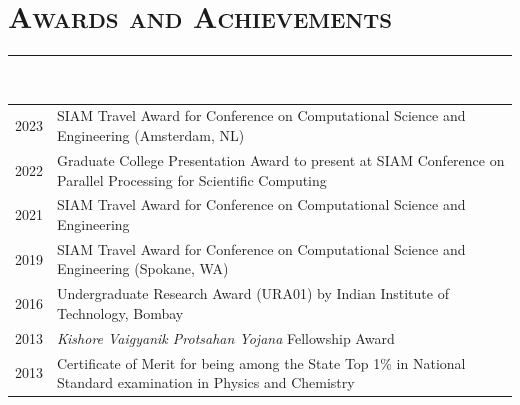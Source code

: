 \documentclass[letterpaper, 13pt]{article}
\begin{document}



\nocite{*}
\printbibliography[title={\Large\textsc{Publications}\vspace*{-2ex}\\\rule{\textwidth}{0.1ex}},filter=papers]
\printbibliography[title={\Large\textsc{Talks}\vspace*{-2ex}\\\rule{\textwidth}{0.1ex}},type=inproceedings, resetnumbers=true]

\pagebreak


\section*{\Large\textsc{Awards and Achievements}}
\vspace{-4ex}
\rule{\textwidth}{0.1ex}
\vspace{1ex}\\
\begin{tabular}{p{} p{}}
  2023    &   SIAM Travel Award for Conference on Computational Science and
    Engineering (Amsterdam, NL)\vspace{1ex}\\
  2022    &   Graduate College Presentation Award to present at SIAM Conference
    on Parallel Processing for Scientific Computing \vspace{1ex}\\
  2021    &   SIAM Travel Award for Conference on Computational Science and
    Engineering \vspace{1ex}\\
  2019    &   SIAM Travel Award for Conference on Computational Science and
    Engineering (Spokane, WA) \vspace{1ex}\\
  2016    &   Undergraduate Research Award (URA01) by Indian Institute of
    Technology, Bombay \vspace{1ex}\\
  2013    &   \textit{Kishore Vaigyanik Protsahan Yojana} Fellowship
    Award\vspace{1ex} \\
  2013    &   Certificate of Merit for being among the State Top 1\% in National
    Standard examination in Physics and Chemistry \\
\end{tabular} 
\end{document}
